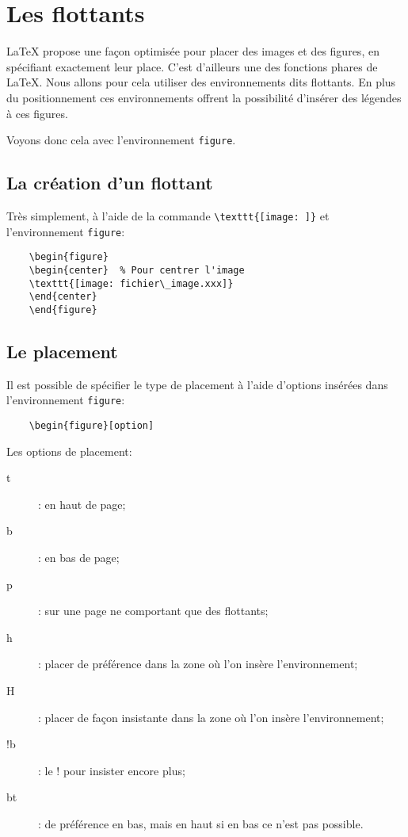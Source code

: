 
\chapter{Les flottants}
\LaTeX{} propose une façon optimisée pour placer des images et des figures, en spécifiant exactement leur place. C'est d'ailleurs une des fonctions phares de \LaTeX{}. Nous allons pour cela utiliser des environnements dits \og flottants\fg{}. En plus du positionnement ces environnements offrent la possibilité d'insérer des légendes à ces figures.
\medskip

Voyons donc cela avec l'environnement \texttt{figure}.
\medskip

\section{La création d'un flottant}
Très simplement, à l'aide de la commande \verb|\texttt{[image: ]}| et l'environnement \texttt{figure}:
\begin{verbatim}
    \begin{figure}
    \begin{center}  % Pour centrer l'image
    \texttt{[image: fichier\_image.xxx]}
    \end{center}    
    \end{figure} 
\end{verbatim}
\medskip

\section{Le placement}
Il est possible de spécifier le type de placement à l'aide d'options insérées dans l'environnement \texttt{figure}:
\begin{verbatim}
    \begin{figure}[option]
\end{verbatim}
\medskip

Les options de placement:
\begin{description}
	\item[t]: en haut de page;
	\item[b]: en bas de page;
	\item[p]: sur une page ne comportant que des flottants;
	\item[h]: placer de préférence dans la zone où l'on insère l'environnement;
	\item[H]: placer de façon insistante dans la zone où l'on insère l'environnement;
	\item[!b]: le \og !\fg{} pour insister encore plus;
	\item[bt]: de préférence en bas, mais en haut si en bas ce n'est pas possible. 
\end{description}
\medskip

